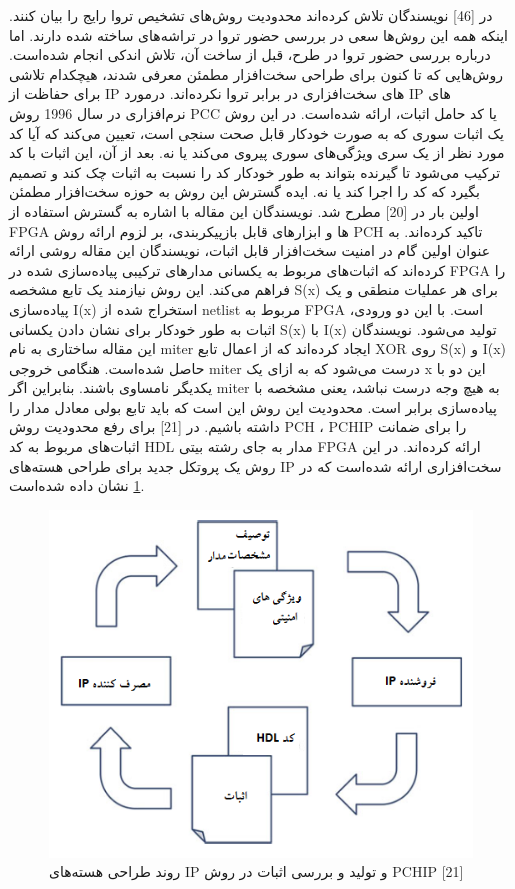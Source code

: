 
در [46] نویسندگان تلاش کرده‌اند محدودیت روش‌های تشخیص تروا رایج را بیان کنند. اینکه همه این روش‌ها سعی در بررسی حضور تروا در تراشه‌های ساخته شده دارند. اما درباره بررسی حضور تروا در طرح، قبل از ساخت آن، تلاش اندکی انجام شده‌است. روش‌هایی که تا کنون برای طراحی سخت‌افزار مطمئن معرفی شدند، هیچکدام تلاشی برای حفاظت از IP های سخت‌افزاری در برابر تروا نکرده‌اند. درمورد IP های نرم‌افزاری در سال 1996 روش PCC یا کد حامل اثبات، ارائه شده‌است. در این روش یک اثبات سوری که به صورت خودکار قابل صحت سنجی است، تعیین می‌کند که آیا کد مورد نظر از یک سری ویژگی‌های سوری پیروی می‌کند یا نه. بعد از آن، این اثبات با کد ترکیب می‌شود تا گیرنده بتواند به طور خودکار کد را نسبت به اثبات چک کند و تصمیم بگیرد که کد را اجرا کند یا نه.
ایده گسترش این روش به حوزه سخت‌افزار مطمئن اولین بار در [20] مطرح شد. نویسندگان این مقاله با اشاره به گسترش استفاده از FPGA ها و ابزارهای قابل بازپیکربندی، بر لزوم ارائه روش PCH تاکید کرده‌اند. به عنوان اولین گام در امنیت سخت‌افزار قابل اثبات، نویسندگان این مقاله روشی ارائه کرده‌اند که اثبات‌های مربوط به یکسانی مدارهای ترکیبی پیاده‌سازی شده در FPGA را فراهم می‌کند. این روش نیازمند یک تابع مشخصه S(x) برای هر عملیات منطقی و یک پیاده‌سازی I(x) استخراج شده از netlist مربوط به FPGA است. با این دو ورودی، اثبات به طور خودکار برای نشان دادن یکسانی S(x) با I(x) تولید می‌شود. نویسندگان این مقاله ساختاری به نام miter ایجاد کرده‌اند که از اعمال تابع XOR روی S(x) و I(x) حاصل شده‌است. هنگامی خروجی miter درست می‌شود که به ازای یک x این دو با یکدیگر نامساوی باشند. بنابراین اگر miter به هیچ وجه درست نباشد، یعنی مشخصه با پیاده‌سازی برابر است.  محدودیت این روش این است که باید تابع بولی معادل مدار را داشته باشیم.
در [21] برای رفع محدودیت روش PCH ، PCHIP  را برای ضمانت اثبات‌های مربوط به کد HDL مدار به جای رشته بیتی FPGA ارائه کرده‌اند. در این روش یک پروتکل جدید  برای طراحی  هسته‌های IP سخت‌افزاری ارائه شده‌است که در \ref{fig8-5} نشان داده شده‌است.

 \begin{figure}
\begin{center}
\includegraphics[scale=.8]{figs/fig8-5.png}
\caption{روند طراحی هسته‌های IP و تولید و بررسی اثبات در روش PCHIP [21]}
\label{fig8-5}
\end{center}
\end{figure} 

